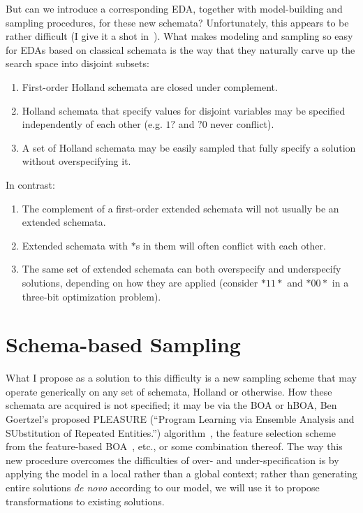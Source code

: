 \documentclass[letterpaper]{article}
\begin{document}
But can we introduce a corresponding EDA, together with model-building and
sampling procedures, for these new schemata? Unfortunately, this appears to be
rather difficult (I give it a shot in~\cite{fbBOA}). What makes modeling and
sampling so easy for EDAs based on classical schemata is the way that they
naturally carve up the search space into disjoint subsets:
\begin{enumerate}
\item First-order Holland schemata are closed under complement.
\item Holland schemata that specify values for disjoint variables may be
  specified independently of each other (e.g. $1?$ and $?0$ never conflict).
\item A set of Holland schemata may be easily sampled that fully specify a
  solution without overspecifying it.
\end{enumerate}
In contrast:
\begin{enumerate}
\item The complement of a first-order extended schemata will not usually be an
  extended schemata.
\item Extended schemata with $*$s in them will often conflict with each other.
\item The same set of extended schemata can both overspecify and underspecify
  solutions, depending on how they are applied (consider $*11*$ and $*00*$ in a
  three-bit optimization problem).
\end{enumerate}

\section{Schema-based Sampling}

What I propose as a solution to this difficulty is a new sampling scheme that
may operate generically on any set of schemata, Holland or otherwise. How these
schemata are acquired is not specified; it may be via the BOA or hBOA, Ben
Goertzel's proposed PLEASURE (``Program Learning via Ensemble Analysis and
SUbstitution of Repeated Entities.'') algorithm~\cite{PLEASURE}, the feature
selection scheme from the feature-based BOA~\cite{fbBOA}, etc., or some
combination thereof. The way this new procedure overcomes the difficulties of
over- and under-specification is by applying the model in a local rather than a
global context; rather than generating entire solutions \emph{de novo}
according to our model, we will use it to propose transformations to existing
solutions.
\end{document}
